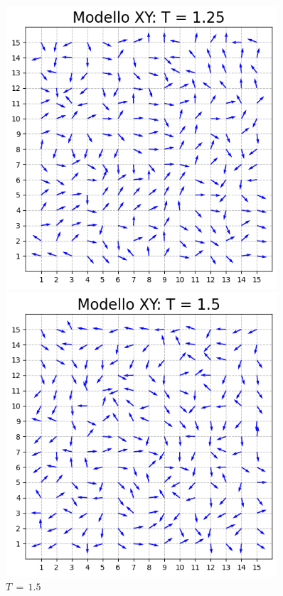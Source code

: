 \begin{figure}[H]
    \begin{minipage}{0.45\textwidth}  
      \centering
      \includegraphics[page=1, width=0.9\textwidth]{Immagini/simModelloXY/conf_T1.25.png}
      \caption{$T\,=\,1.25$}
    \end{minipage}\hfill
    \begin{minipage}{0.45\textwidth}  
      \centering
      \includegraphics[page=1, width=0.9\textwidth]{Immagini/simModelloXY/conf_T1.5.png}
      \caption{$T\,=\,1.5$}
    \end{minipage}
    
\end{figure}

\vspace*{\fill}